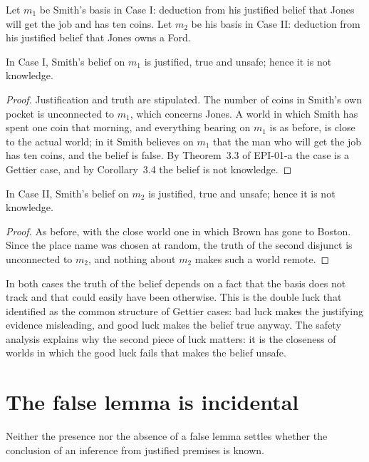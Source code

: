 \documentclass{situationist-preprint}
\begin{document}
Let $m_1$ be Smith's basis in Case I: deduction from his justified belief that Jones will get the job and has ten coins. Let $m_2$ be his basis in Case II: deduction from his justified belief that Jones owns a Ford.

\begin{proposition}\label{p:case1}
In Case I, Smith's belief on $m_1$ is justified, true and unsafe; hence it is not knowledge.
\end{proposition}

\begin{proof}
Justification and truth are stipulated. The number of coins in Smith's own pocket is unconnected to $m_1$, which concerns Jones. A world in which Smith has spent one coin that morning, and everything bearing on $m_1$ is as before, is close to the actual world; in it Smith believes on $m_1$ that the man who will get the job has ten coins, and the belief is false. By Theorem~3.3 of EPI-01-a the case is a Gettier case, and by Corollary~3.4 the belief is not knowledge.
\end{proof}

\begin{proposition}\label{p:case2}
In Case II, Smith's belief on $m_2$ is justified, true and unsafe; hence it is not knowledge.
\end{proposition}

\begin{proof}
As before, with the close world one in which Brown has gone to Boston. Since the place name was chosen at random, the truth of the second disjunct is unconnected to $m_2$, and nothing about $m_2$ makes such a world remote.
\end{proof}

In both cases the truth of the belief depends on a fact that the basis does not track and that could easily have been otherwise. This is the double luck that \citet{Zagzebski1994} identified as the common structure of Gettier cases: bad luck makes the justifying evidence misleading, and good luck makes the belief true anyway. The safety analysis explains why the second piece of luck matters: it is the closeness of worlds in which the good luck fails that makes the belief unsafe.

\section{The false lemma is incidental}

\begin{corollary}\label{c:lemma}
Neither the presence nor the absence of a false lemma settles whether the conclusion of an inference from justified premises is known.
\end{corollary}
\end{document}
